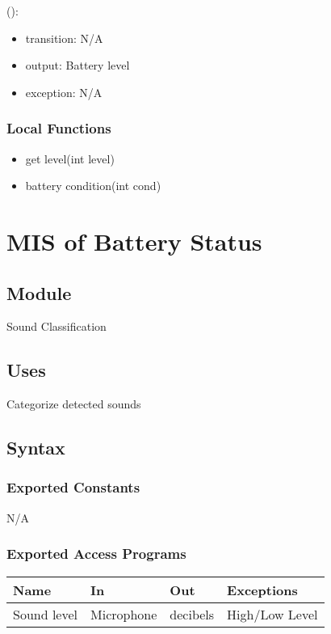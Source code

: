\documentclass[12pt, titlepage]{article}
\begin{document}
\noindent {}():
\begin{itemize}
\item transition: N/A 
\item output: Battery level
\item exception: N/A
\end{itemize}

\subsubsection{Local Functions}
\begin{itemize}
\item get level(int level)
\item battery condition(int cond)
\end{itemize}

\section{MIS of Battery Status} \label{Module}

\subsection{Module}

Sound Classification

\subsection{Uses}

Categorize detected sounds

\subsection{Syntax}

\subsubsection{Exported Constants}

N/A

\subsubsection{Exported Access Programs}

\begin{center}
\begin{tabular}{p{2cm} p{4cm} p{4cm} p{2cm}}
\hline
\textbf{Name} & \textbf{In} & \textbf{Out} & \textbf{Exceptions} \\
\hline
Sound level & Microphone & decibels & High/Low Level \\
\hline
\end{tabular}
\end{center}
\end{document}
